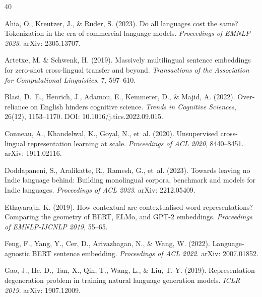 \documentclass[11pt,a4paper]{article}
\begin{document}


\begin{thebibliography}{40}

Ahia, O., Kreutzer, J., \& Ruder, S. (2023).
\newblock Do all languages cost the same? Tokenization in the era of commercial
language models.
\newblock \emph{Proceedings of EMNLP 2023}.
\newblock arXiv: 2305.13707.

Artetxe, M. \& Schwenk, H. (2019).
\newblock Massively multilingual sentence embeddings for zero-shot cross-lingual
transfer and beyond.
\newblock \emph{Transactions of the Association for Computational Linguistics}, 7,
597--610.

Blasi, D.~E., Henrich, J., Adamou, E., Kemmerer, D., \& Majid, A. (2022).
\newblock Over-reliance on {English} hinders cognitive science.
\newblock \emph{Trends in Cognitive Sciences}, 26(12), 1153--1170.
\newblock DOI: 10.1016/j.tics.2022.09.015.

Conneau, A., Khandelwal, K., Goyal, N., et~al. (2020).
\newblock Unsupervised cross-lingual representation learning at scale.
\newblock \emph{Proceedings of ACL 2020}, 8440--8451.
\newblock arXiv: 1911.02116.

Doddapaneni, S., Aralikatte, R., Ramesh, G., et~al. (2023).
\newblock Towards leaving no {Indic} language behind: Building monolingual corpora,
benchmark and models for {Indic} languages.
\newblock \emph{Proceedings of ACL 2023}.
\newblock arXiv: 2212.05409.

Ethayarajh, K. (2019).
\newblock How contextual are contextualised word representations? Comparing the
geometry of {BERT}, {ELMo}, and {GPT-2} embeddings.
\newblock \emph{Proceedings of EMNLP-IJCNLP 2019}, 55--65.

Feng, F., Yang, Y., Cer, D., Arivazhagan, N., \& Wang, W. (2022).
\newblock Language-agnostic {BERT} sentence embedding.
\newblock \emph{Proceedings of ACL 2022}.
\newblock arXiv: 2007.01852.

Gao, J., He, D., Tan, X., Qin, T., Wang, L., \& Liu, T.-Y. (2019).
\newblock Representation degeneration problem in training natural language generation
models.
\newblock \emph{ICLR 2019}.
\newblock arXiv: 1907.12009.


\end{thebibliography}
\end{document}

